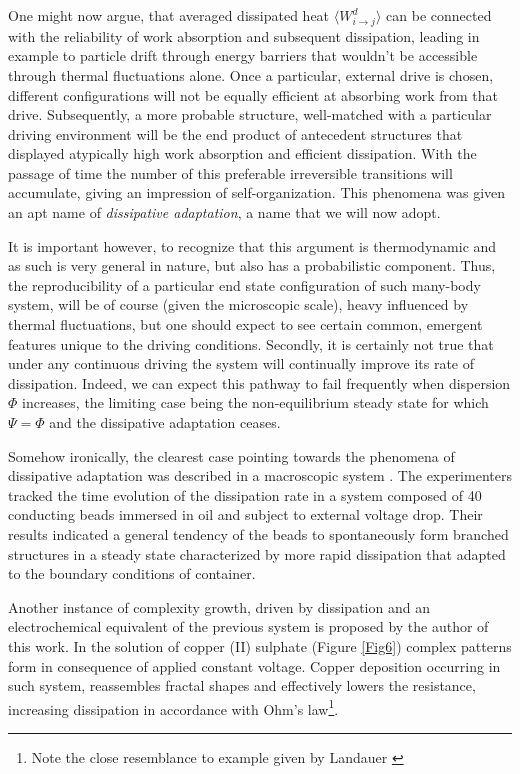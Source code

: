 \documentclass[a4paper,12pt]{article}
\begin{document}
One might now argue, that averaged dissipated heat $\langle W^d_{i \to j} \rangle $ can be connected with the reliability of work absorption and subsequent dissipation, leading in example to particle drift through energy barriers that wouldn't be accessible through thermal fluctuations alone.
Once a particular, external drive is chosen, different configurations will not be equally efficient at absorbing work from that drive. Subsequently, a more probable structure, well-matched with a particular driving environment will be the end product of antecedent structures that displayed atypically high work absorption and efficient dissipation.
With the passage of time the number of this preferable irreversible transitions will accumulate, giving an impression of self-organization.
This phenomena was given an apt name of \textit{dissipative adaptation}, a name that we will now adopt.

It is important however, to recognize that this argument is thermodynamic and as such is very general in nature, but also has a probabilistic component.
Thus, the reproducibility of a particular end state configuration of such many-body system, will be of course (given the microscopic scale), heavy influenced by thermal fluctuations, but one should expect to see certain common, emergent features unique to the driving conditions.
Secondly, it is certainly not true that under any continuous driving the system will continually improve its rate of dissipation. Indeed, we can expect this pathway to fail frequently when dispersion $\Phi$ increases, the limiting case being the non-equilibrium steady state for which $\Psi = \Phi$ and the dissipative adaptation ceases.


Somehow ironically, the clearest case pointing towards the phenomena of dissipative adaptation was described in a macroscopic system \cite{Kondepudi:2015bg}. The experimenters tracked the time evolution of the dissipation rate in a system composed of 40 conducting beads immersed in oil and subject to external voltage drop. Their results indicated a general tendency of the beads to spontaneously form branched structures in a steady state characterized by more rapid dissipation that adapted to the boundary conditions of container.

Another instance of complexity growth, driven by dissipation and an electrochemical equivalent of the previous system is proposed by the author of this work. 
In the solution of copper (II) sulphate (Figure \ref{Fig6}) complex patterns form in consequence of applied constant voltage.
Copper deposition occurring in such system, reassembles fractal shapes and effectively lowers the resistance, increasing dissipation in accordance with Ohm's law\footnote{Note the close resemblance to example given by Landauer \cite{Landauer:pJ4RYJRG}}.
\end{document}
